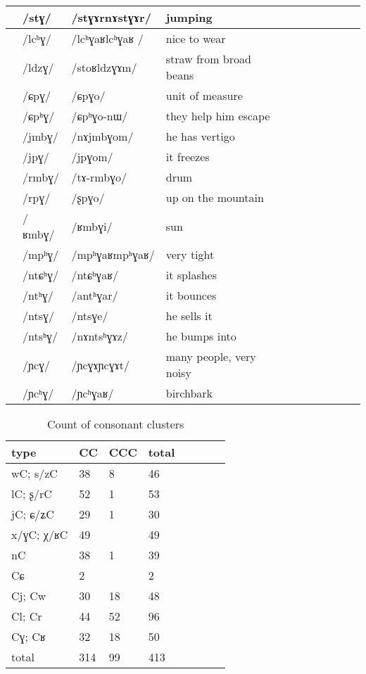 \documentclass[oldfontcommands,oneside,a4paper,11pt]{article}
\newcommand{\ipa}[1]{{\phon/#1/}} %
\newcommand{\deux}[1]{/#1/}
\newcommand{\trois}[1]{/#1/}
\newcommand{\idph}[1]{\cellcolor{gray}\textbf{#1}}
\begin{document}
\begin{table}
{\begin{tabular}{l|lll|lll|lll|l}
		&\trois{stɣ}  	&\ipa{stɣɤrnɤstɣɤr}  	& jumping	&	&	&\\
\midrule						
	&\trois{lcʰɣ} \idph{} 	&\ipa{lcʰɣaʁlcʰɣaʁ }  	&nice to wear	&	&	&\\
	&\trois{ldzɣ}  	&\ipa{stoʁldzɣɤm}  	&straw from broad beans 	&	&	&\\
\midrule				
&\deux{ɕpɣ}		&\ipa{ɕpɣo}  	&unit of measure	&	&	&\\
	&\trois{ɕpʰɣ}  	&\ipa{ɕpʰɣo-nɯ}  	&they help him escape	&	&	&\\
\midrule						
	&\trois{jmbɣ}  	&\ipa{nɤjmbɣom}  	&he has vertigo	&	&	&\\
	&\trois{jpɣ}  	&\ipa{jpɣom}  	&it freezes	&	&	&\\
\midrule						
 	&\trois{rmbɣ}  	&\ipa{tɤ-rmbɣo}  	&drum	&	&	&\\
	&\trois{rpɣ}  	&\ipa{ʂpɣo}  	&up on the mountain	&	&	&\\
\midrule						
	&\trois{ʁmbɣ}  	&\ipa{ʁmbɣi}  	&sun	&	&	&\\
\midrule		
	&\trois{mpʰɣ}\idph{}   	&\ipa{mpʰɣaʁmpʰɣaʁ}  	&very tight	&	&	&\\				
	&\trois{ntɕʰɣ}  	&\ipa{ntɕʰɣaʁ}  	&it splashes	&	&	&\\
	&\trois{ntʰɣ}  	&\ipa{antʰɣar}  	&it bounces	&	&	&\\
	&\trois{ntsɣ}  	&\ipa{ntsɣe}  	&he sells it	&	&	&\\
	&\trois{ntsʰɣ}  	&\ipa{nɤntsʰɣɤz}  	&he bumps into	&	&	&\\
	&\trois{ɲcɣ}\idph{}  	&\ipa{ɲcɣɤɲcɣɤt}  	&many people, very noisy	&	&	&\\
	&\trois{ɲcʰɣ}  	&\ipa{ɲcʰɣaʁ}  	&birchbark	&	&	&\\
\end{tabular}}
\end{table}	
						
		   \begin{table}
 \caption{Count of consonant clusters} \label{tab:clusters.tot}  \centering
\begin{tabular}{llllllll}
\toprule		
type &CC& CCC& total\\		
\midrule
wC; s/zC  & 	38  & 	8  & 	46  & 	\\	
lC; ʂ/rC  & 	52  & 	1  & 	53  & 	\\	
jC; ɕ/ʑC  & 	29  & 	1  & 	30  & 	\\	
x/ɣC; χ/ʁC  & 	49 & 	  & 	49  & 	\\	
nC  & 	38  & 	1  & 	39  & 	\\	
\midrule
Cɕ  & 	2  & 	  & 	  2& 	\\	
\midrule
Cj; Cw  & 	30  & 	18  & 	48  & 	\\	
Cl; Cr  & 	44  & 	52  & 	96  & 	\\	
Cɣ; Cʁ  & 	32  & 	18  & 	50  & 	\\	
\midrule
total  & 	314  & 	99  & 	413  & 	\\	
\bottomrule
\end{tabular}
\end{table}
 
\end{document}
